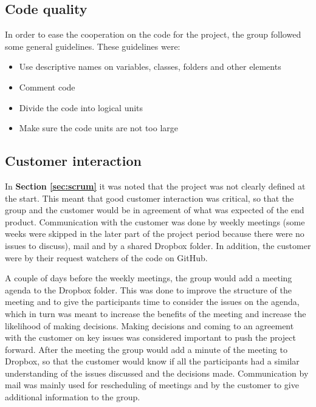\subsection{Code quality}

In order to ease the cooperation on the code for the project, the group followed some general guidelines. These guidelines were:
\begin{itemize}
	\item Use descriptive names on variables, classes, folders and other elements
	\item Comment code
	\item Divide the code into logical units 
	\item Make sure the code units are not too large
\end{itemize}

\subsection{Customer interaction}

In \textbf{Section \ref{sec:scrum}} it was noted that the project was not clearly defined at the start. This meant that good customer interaction was critical, so that the group and the customer would be in agreement of what was expected of the end product. Communication with the customer was done by weekly meetings (some weeks were skipped in the later part of the project period because there were no issues to discuss), mail and by a shared Dropbox folder. In addition, the customer were by their request watchers of the code on GitHub. \newline

A couple of days before the weekly meetings, the group would add a meeting agenda to the Dropbox folder. This was done to improve the structure of the meeting and to give the participants time to consider the issues on the agenda, which in turn was meant to increase the benefits of the meeting and increase the likelihood of making decisions. Making decisions and coming to an agreement with the customer on key issues was considered important to push the project forward. After the meeting the group would add a minute of the meeting to Dropbox, so that the customer would know if all the participants had a similar understanding of the issues discussed and the decisions made. Communication by mail was mainly used for rescheduling of meetings and by the customer to give additional information to the group. 

\cleardoublepage